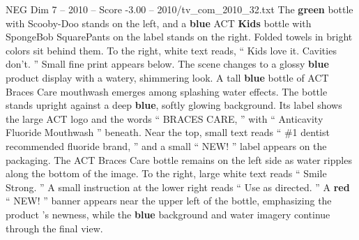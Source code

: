 \begin{textsample}{NEG Dim 7 – 2010 – Score -3.00 – 2010/tv\_com\_2010\_32.txt}
The \textbf{green} bottle with Scooby-Doo stands on the left, and a \textbf{blue} ACT \textbf{Kids} bottle with SpongeBob SquarePants on the label stands on the right.
Folded towels in bright colors sit behind them.
To the right, white text reads, “ Kids love it.
Cavities don't. ” Small fine print appears below.
The scene changes to a glossy \textbf{blue} product display with a watery, shimmering look.
A tall \textbf{blue} bottle of ACT Braces Care mouthwash emerges among splashing water effects.
The bottle stands upright against a deep \textbf{blue}, softly glowing background.
Its label shows the large ACT logo and the words “ BRACES CARE, ” with “ Anticavity Fluoride Mouthwash ” beneath.
Near the top, small text reads “ \#1 dentist recommended fluoride brand, ” and a small “ NEW! ” label appears on the packaging.
The ACT Braces Care bottle remains on the left side as water ripples along the bottom of the image.
To the right, large white text reads “ Smile Strong. ” A small instruction at the lower right reads “ Use as directed. ” A \textbf{red} “ NEW! ” banner appears near the upper left of the bottle, emphasizing the product ’s newness, while the \textbf{blue} background and water imagery continue through the final view.

\end{textsample}
